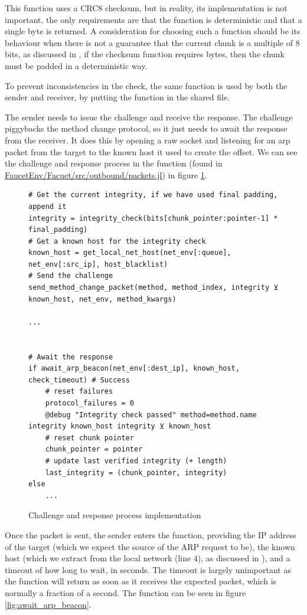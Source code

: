 This function uses a CRC8 checksum, but in reality, its implementation is not important, the only requirements are that the function is deterministic and that a single byte is returned. A consideration for choosing such a function should be its behaviour when there is not a guarantee that the current chunk is a multiple of 8 bits, as discussed in , if the checksum function requires bytes, then the chunk must be padded in a deterministic way.

To prevent inconsistencies in the check, the same function is used by both the sender and receiver, by putting the function in the shared  file.

The sender needs to issue the challenge and receive the response. The challenge piggybacks the method change protocol, so it just needs to await the response from the receiver. It does this by opening a raw socket and listening for an arp packet from the target to the known host it used to create the offset. We can see the challenge and response process in the  function (found in \url{FaucetEnv/Facuet/src/outbound/packets.jl}) in figure \ref{fig:chal_resp}.

\begin{figure}[h]
\begin{lstlisting}[language=JuliaLocal, style=julia]
# Get the current integrity, if we have used final padding, append it
integrity = integrity_check(bits[chunk_pointer:pointer-1] * final_padding)
# Get a known host for the integrity check
known_host = get_local_net_host(net_env[:queue], net_env[:src_ip], host_blacklist)
# Send the challenge
send_method_change_packet(method, method_index, integrity ⊻ known_host, net_env, method_kwargs)

...


# Await the response
if await_arp_beacon(net_env[:dest_ip], known_host, check_timeout) # Success
    # reset failures
    protocol_failures = 0
    @debug "Integrity check passed" method=method.name integrity known_host integrity ⊻ known_host
    # reset chunk pointer
    chunk_pointer = pointer
    # update last verified integrity (+ length)
    last_integrity = (chunk_pointer, integrity)
else
    ...
\end{lstlisting}
\caption{Challenge and response process implementation}
\label{fig:chal_resp}
\end{figure}

Once the packet is sent, the sender enters the  function, providing the IP address of the target (which we expect the source of the ARP request to be), the known host (which we extract from the local network (line 4), as discussed in ), and a timeout of how long to wait, in seconds. The timeout is largely unimportant as the function will return as soon as it receives the expected packet, which is normally a fraction of a second. The function can be seen in figure \ref{fig:await_arp_beacon}.

